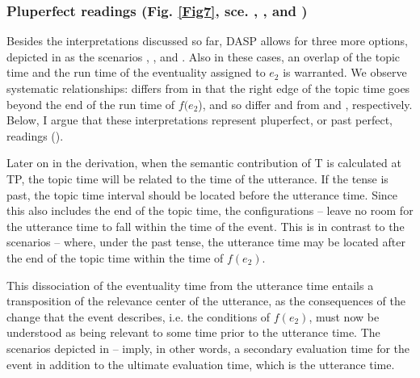 \documentclass[output=paper,colorlinks,citecolor=brown]{langscibook}
\begin{document}
\subsubsection{Pluperfect readings (Fig. \ref{Fig7}, sce. , , and )}\label{plu}
Besides the interpretations discussed so far, DASP 
allows for three more options, depicted in  as the scenarios
 , , and .
Also in these cases, an overlap of the topic time and the run time of the eventuality assigned to $e_2$ is warranted.
We observe systematic relationships:
 differs from  in that the right edge of the topic time goes beyond the end of the run time of $f(e_2$), and so differ  and  
from  and , respectively. Below, I argue that these interpretations
represent pluperfect, or past perfect, readings (\citealt[133]{Borik2006}).


Later on in the derivation, when the semantic contribution of T is calculated at TP, the topic time will be related to the time of the utterance. If the tense is past, the topic time interval should be located before the utterance time. Since this also includes the end of the topic time, the configurations -- leave no room for the utterance time to fall within the time of the event. This is in contrast to the scenarios -- where, under the past tense, the utterance time may be located after the end of the topic time within the time of $f(e_2)$. 

This dissociation of the eventuality time from the utterance time entails a transposition of the relevance center of the utterance, as the consequences of the change that the event describes, i.e. the conditions of $f(e_2)$, must now be understood as being relevant to some time prior to the utterance time. 
The scenarios depicted in -- imply, in other words, a
secondary evaluation time for the event in addition to the ultimate evaluation time, which is the utterance time.   
\end{document}
